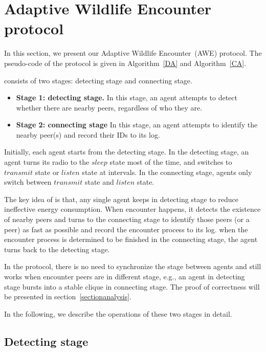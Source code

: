 \section{Adaptive Wildlife Encounter protocol}
\label{sectionmodel}

In this section, we present our Adaptive Wildlife Encounter~(AWE) protocol.
The pseudo-code of the protocol is given in Algorithm~\ref{DA} and Algorithm~\ref{CA}.

{\pName} consists of two stages: detecting stage and 
connecting stage. 
\begin{itemize}
    \item \textbf{Stage 1: detecting stage.} In this stage, an agent attempts to
    detect whether there are nearby peers, regardless of who they are. 
    \item \textbf{Stage 2: connecting stage} In this stage, an agent attempts to 
    identify the nearby peer(s) and record their IDs to its log.
\end{itemize}

Initially, each agent starts from the detecting stage. 
In the detecting stage, an agent turns its radio to the $sleep$ state most of the time,
and switches to $transmit$ state or $listen$ state at intervals.
In the connecting stage, agents only switch between $transmit$ state 
and $listen$ state.

The key idea of {\pName} is that, any single agent keeps in detecting 
stage to reduce ineffective energy consumption. When encounter happens, 
it detects the existence of nearby peers and turns to the connecting stage 
to identify those peers (or a peer) as fast as possible and record the encounter process to its log. 
when the encounter process is determined to be finished in the connecting stage, 
the agent turns back to the detecting stage.

\begin{remark}
    In the {\pName} protocol, there is no need to synchronize the stage between agents and
    {\pName} still works when encounter peers are in different stage, e.g., an agent in detecting 
    stage bursts into a stable clique in connecting stage. 
    The proof of correctness will be presented 
    in section~\ref{sectionanalysis}. 
\end{remark}

In the following, we describe the operations of these two stages in detail. 

\subsection{Detecting stage}

